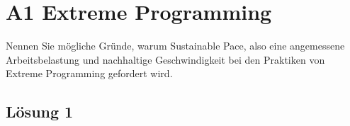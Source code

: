 \documentclass[main.tex]{subfiles}
\begin{document}
\section{A1 Extreme Programming}
Nennen Sie mögliche Gründe, warum Sustainable Pace, also eine angemessene Arbeitsbelastung
und nachhaltige Geschwindigkeit bei den Praktiken von Extreme Programming gefordert wird.

\subsection{Lösung 1}
\end{document}
